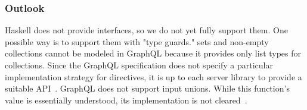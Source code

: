 \begin{frame}\frametitle{Outlook}

\begin{itemize}
      Haskell does not provide interfaces, so we do not yet fully support them. One possible way is to support them with "type guards." 
     sets and non-empty collections cannot be modeled in GraphQL because it provides only list types for collections.  
     Since the GraphQL specification does not specify a particular implementation strategy for directives, it is up to each server library to provide a suitable API~\cite{schema-directives}.
     GraphQL does not support input unions. While this function's value is essentially understood, its implementation is not cleared~\cite{gql-spec-input-unions}. 

\end{itemize}

\end{frame}